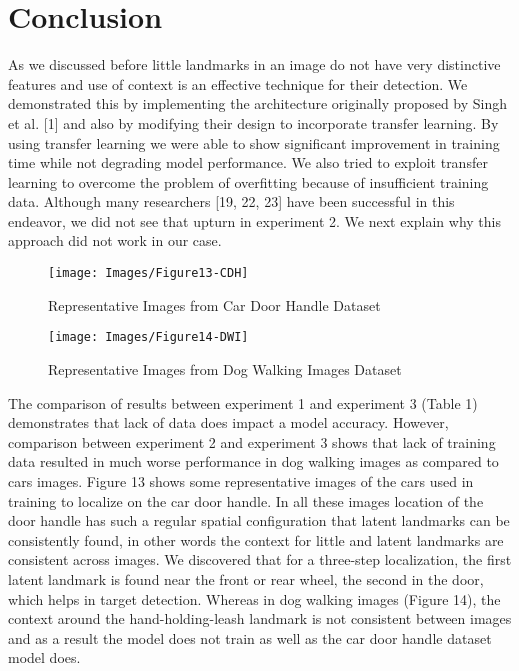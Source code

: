 \documentclass [11pt,letterpaper ,twoside ,openany ]{report}
\begin{document}
    \chapter{Conclusion}
    \doublespacing
    As we discussed before little landmarks in an image do not have very distinctive features and use of context is an effective technique for their detection. We demonstrated this by implementing the architecture originally proposed by Singh et al. [1] and also by modifying their design to incorporate transfer learning. By using transfer learning we were able to show significant improvement in training time while not degrading model performance. We also tried to exploit transfer learning to overcome the problem of overfitting because of insufficient training data. Although many researchers [19, 22, 23] have been successful in this endeavor, we did not see that upturn in experiment 2. We next explain why this approach did not work in our case.\\

    \begin{figure}[h]
      \centering
      \texttt{[image: Images/Figure13-CDH]}
      \caption{Representative Images from Car Door Handle Dataset}
      \label{fig:cdh}
    \end{figure}        

    \begin{figure}[h]
      \centering
      \texttt{[image: Images/Figure14-DWI]}
      \caption{Representative Images from Dog Walking Images Dataset}
      \label{fig:dwi}
    \end{figure}            

    The comparison of results between experiment 1 and experiment 3 (Table 1) demonstrates that lack of data does impact a model accuracy. However, comparison between experiment 2 and experiment 3 shows that lack of training data resulted in much worse performance in dog walking images as compared to cars images. Figure 13 shows some representative images of the cars used in training to localize on the car door handle. In all these images location of the door handle has such a regular spatial configuration that latent landmarks can be consistently found, in other words the context for little and latent landmarks are consistent across images. We discovered that for a three-step localization, the first latent landmark is found near the front or rear wheel, the second in the door, which helps in target detection. Whereas in dog walking images (Figure 14), the context around the hand-holding-leash landmark is not consistent between images and as a result the model does not train as well as the car door handle dataset model does.
\end{document}
